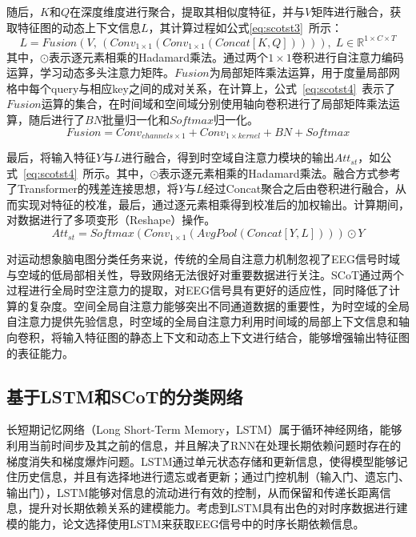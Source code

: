 随后，\(K\)和\(Q\)在深度维度进行聚合，提取其相似度特征，并与\(V\)矩阵进行融合，获取特征图的动态上下文信息\(L\)，其计算过程如公式\ref{eq:scotst3}~所示：
\begin{equation}\label{eq:scotst3}
    L=Fusion(V ,\, (Conv_{1 \times 1}(Conv_{1 \times 1}(Concat[K,Q])))),\;L \in \mathbb{R}^{1 \times C \times T}
\end{equation}
其中，\(\odot\)表示逐元素相乘的Hadamard乘法。通过两个\(1 \times 1\)卷积进行自注意力编码运算，学习动态多头注意力矩阵。\(Fusion\)为局部矩阵乘法运算，用于度量局部网格中每个query与相应key之间的成对关系，在计算上，公式~\ref{eq:scotst4}~表示了\(Fusion\)运算的集合，在时间域和空间域分别使用轴向卷积进行了局部矩阵乘法运算，随后进行了\(BN\)批量归一化和\(Softmax\)归一化。
\begin{equation}\label{eq:scotst4}
    Fusion=Conv_{channels \times 1}+Conv_{1 \times kernel} + BN + Softmax
\end{equation}

最后，将输入特征\(Y\)与\(L\)进行融合，得到时空域自注意力模块的输出\(Att_{st}\)，如公式~\ref{eq:scotst4}~所示。其中，\(\odot\)表示逐元素相乘的Hadamard乘法。融合方式参考了Transformer的残差连接思想，将\(Y\)与\(L\)经过Concat聚合之后由卷积进行融合，从而实现对特征的校准，最后，通过逐元素相乘得到校准后的加权输出。计算期间，对数据进行了多项变形（Reshape）操作。
\begin{equation}\label{eq:scotst5}
    Att_{st}=Softmax(Conv_{1 \times 1}(AvgPool(Concat[Y,L]))) \odot Y
\end{equation}

对运动想象脑电图分类任务来说，传统的全局自注意力机制忽视了EEG信号时域与空域的低局部相关性，导致网络无法很好对重要数据进行关注。SCoT通过两个过程进行全局时空注意力的提取，对EEG信号具有更好的适应性，同时降低了计算的复杂度。空间全局自注意力能够突出不同通道数据的重要性，为时空域的全局自注意力提供先验信息，时空域的全局自注意力利用时间域的局部上下文信息和轴向卷积，将输入特征图的静态上下文和动态上下文进行结合，能够增强输出特征图的表征能力。

\subsection{基于LSTM和SCoT的分类网络}

长短期记忆网络（Long Short-Term Memory，LSTM）属于循环神经网络，能够利用当前时间步及其之前的信息，并且解决了RNN在处理长期依赖问题时存在的梯度消失和梯度爆炸问题。LSTM通过单元状态存储和更新信息，使得模型能够记住历史信息，并且有选择地进行遗忘或者更新；通过门控机制（输入门、遗忘门、输出门），LSTM能够对信息的流动进行有效的控制，从而保留和传递长距离信息，提升对长期依赖关系的建模能力。考虑到LSTM具有出色的对时序数据进行建模的能力，论文选择使用LSTM来获取EEG信号中的时序长期依赖信息。

